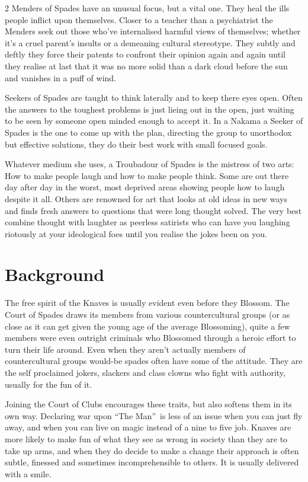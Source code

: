 \begin{multicols}{2}
Menders of Spades have an unusual focus, but a vital one. They heal the ills people inflict upon themselves. Closer to a teacher than a psychiatrist the Menders seek out those who've internalised harmful views of themselves; whether it's a cruel parent's insults or a demeaning cultural stereotype. They subtly and deftly they force their patents to confront their opinion again and again until they realise at last that it was no more solid than a dark cloud before the sun and vanishes in a puff of wind.

Seekers of Spades are taught to think laterally and to keep there eyes open. Often the answers to the toughest problems is just lieing out in the open, just waiting to be seen by someone open minded enough to accept it. In a Nakama a Seeker of Spades is the one to come up with the plan, directing the group to unorthodox but effective solutions, they do their best work with small focused goals. 

Whatever medium she uses, a Troubadour of Spades is the mistress of two arts: How to make people laugh and how to make people think. Some are out there day after day in the worst, most deprived areas showing people how to laugh despite it all. Others are renowned for art that looks at old ideas in new ways and finds fresh answers to questions that were long thought solved. The very best combine thought with laughter as peerless satirists who can have you laughing riotously at your ideological foes until you realise the jokes been on you. 

\section*{Background}

The free spirit of the Knaves is usually evident even before they Blossom. The Court of Spades draws its members from various countercultural groups (or as close as it can get given the young age of the average Blossoming), quite a few members were even outright criminals who Blossomed through a heroic effort to turn their life around.  Even when they aren't actually members of countercultural groups would-be spades often have some of the attitude. They are the self proclaimed jokers, slackers and class clowns who fight with authority, usually for the fun of it. 

Joining the Court of Clubs encourages these traits, but also softens them in its own way. Declaring war upon \textquotedblleft The Man\textquotedblright\, is less of an issue when you can just fly away, and when you can live on magic instead of a nine to five job. Knaves are more likely to make fun of what they see as wrong in society than they are to take up arms, and when they do decide to make a change their approach is often subtle, finessed and sometimes incomprehensible to others. It is usually delivered with a smile.


\end{multicols}
